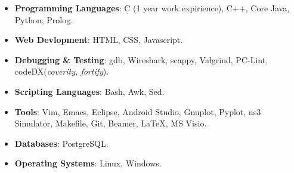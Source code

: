 \begin{multicols}{2}
\begin{itemize}
  \item \textbf{Programming Languages}: C (1 year work expirience), C++, Core Java, Python, Prolog.\\[-0.6cm]
  \item \textbf{Web Devlopment}: HTML, CSS, Javascript.\\[-0.6cm]
  \item \textbf{Debugging \& Testing}: gdb, Wireshark, scappy, Valgrind, PC-Lint, codeDX(\textit{coverity, fortify}).
\end{itemize}
\columnbreak
\begin{itemize}
 \item \textbf{Scripting Languages}: Bash, Awk, Sed.\\[-0.6cm]
  \item \textbf{Tools}: Vim, Emacs, Eclipse, Android Studio, Gnuplot, Pyplot, ns3 Simulator, Makefile, Git, Beamer, \LaTeX, MS Visio.\\[-0.6cm]
    \item \textbf{Databases}: PostgreSQL. \\[-0.6cm]
  \item \textbf{Operating Systems}: Linux, Windows.\\[-0.6cm]
\end{itemize}
\end{multicols}


